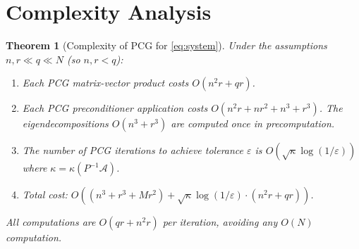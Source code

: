 \documentclass[12pt]{article}
\newtheorem{theorem}{Theorem}
\begin{document}
\section{Complexity Analysis}

\begin{theorem}[Complexity of PCG for \eqref{eq:system}]\label{thm:complexity}
Under the assumptions $n, r \ll q \ll N$ (so $n, r < q$):
\begin{enumerate}
\item Each PCG matrix-vector product costs $O(n^2 r + qr)$.
\item Each PCG preconditioner application costs $O(n^2 r + nr^2 + n^3 + r^3)$. The eigendecompositions $O(n^3 + r^3)$ are computed once in precomputation.
\item The number of PCG iterations to achieve tolerance $\varepsilon$ is $O(\sqrt{\kappa} \log(1/\varepsilon))$ where $\kappa = \kappa(P^{-1}\mathcal{A})$.
\item Total cost: $O\!\left((n^3 + r^3 + Mr^2) + \sqrt{\kappa}\log(1/\varepsilon) \cdot (n^2 r + qr)\right)$.
\end{enumerate}

All computations are $O(qr + n^2 r)$ per iteration, avoiding any $O(N)$ computation.
\end{theorem}
\end{document}
